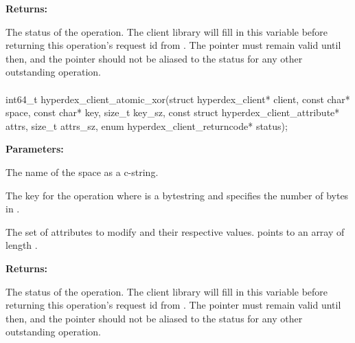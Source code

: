 \noindent\textbf{Returns:}
\begin{description}[labelindent=\widthof{{\code{status}}},leftmargin=*,noitemsep,nolistsep,align=right]
\item[\code{status}] The status of the operation.  The client library will fill in this variable before returning this operation's request id from .  The pointer must remain valid until then, and the pointer should not be aliased to the status for any other outstanding operation.
\end{description}

\paragraph{}
\label{api:c:atomic_xor}
\begin{ccode}
int64_t hyperdex_client_atomic_xor(struct hyperdex_client* client,
        const char* space,
        const char* key, size_t key_sz,
        const struct hyperdex_client_attribute* attrs, size_t attrs_sz,
        enum hyperdex_client_returncode* status);
\end{ccode}
\funcdesc 

\noindent\textbf{Parameters:}
\begin{description}[labelindent=\widthof{{\code{attrs}, \code{attrs\_sz}}},leftmargin=*,noitemsep,nolistsep,align=right]
\item[\code{space}] The name of the space as a c-string.
\item[\code{key}, \code{key\_sz}] The key for the operation where  is a bytestring and  specifies the number of bytes in .
\item[\code{attrs}, \code{attrs\_sz}] The set of attributes to modify and their respective values.   points to an array of length .
\end{description}

\noindent\textbf{Returns:}
\begin{description}[labelindent=\widthof{{\code{status}}},leftmargin=*,noitemsep,nolistsep,align=right]
\item[\code{status}] The status of the operation.  The client library will fill in this variable before returning this operation's request id from .  The pointer must remain valid until then, and the pointer should not be aliased to the status for any other outstanding operation.
\end{description}

